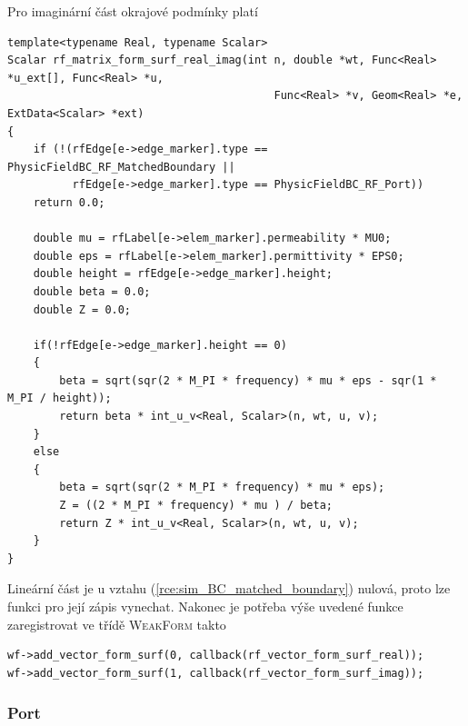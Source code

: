 Pro imaginární část okrajové podmínky platí
\begin{verbatim}
template<typename Real, typename Scalar>
Scalar rf_matrix_form_surf_real_imag(int n, double *wt, Func<Real> *u_ext[], Func<Real> *u,
                                         Func<Real> *v, Geom<Real> *e, ExtData<Scalar> *ext)
{
    if (!(rfEdge[e->edge_marker].type == PhysicFieldBC_RF_MatchedBoundary ||
          rfEdge[e->edge_marker].type == PhysicFieldBC_RF_Port))
    return 0.0;

    double mu = rfLabel[e->elem_marker].permeability * MU0;
    double eps = rfLabel[e->elem_marker].permittivity * EPS0;
    double height = rfEdge[e->edge_marker].height;
    double beta = 0.0;
    double Z = 0.0;

    if(!rfEdge[e->edge_marker].height == 0)
    {
        beta = sqrt(sqr(2 * M_PI * frequency) * mu * eps - sqr(1 * M_PI / height));
        return beta * int_u_v<Real, Scalar>(n, wt, u, v);
    }
    else
    {
        beta = sqrt(sqr(2 * M_PI * frequency) * mu * eps);
        Z = ((2 * M_PI * frequency) * mu ) / beta;
        return Z * int_u_v<Real, Scalar>(n, wt, u, v);
    }
}
\end{verbatim}
Lineární část je u vztahu (\ref{rce:sim_BC_matched_boundary}) nulová, proto lze funkci pro její zápis vynechat.
Nakonec je potřeba výše uvedené funkce zaregistrovat ve třídě \textsc{WeakForm} takto
\begin{verbatim}
wf->add_vector_form_surf(0, callback(rf_vector_form_surf_real));
wf->add_vector_form_surf(1, callback(rf_vector_form_surf_imag));           
\end{verbatim}
                
\subsubsection*{Port}


